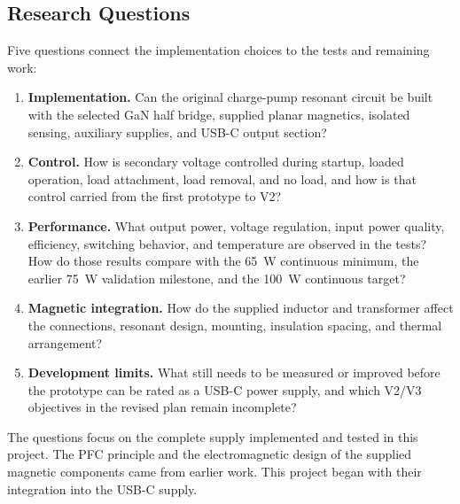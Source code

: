 \begin{samepage}
\section{Research Questions}
\label{sec:intro-rq}

Five questions connect the implementation choices to the tests and remaining work:
\begin{enumerate}[label=\textbf{RQ\arabic*:}]
\item \textbf{Implementation.} Can the original charge-pump resonant circuit be built with the selected GaN half bridge, supplied planar magnetics, isolated sensing, auxiliary supplies, and USB-C output section?
\item \textbf{Control.} How is secondary voltage controlled during startup, loaded operation, load attachment, load removal, and no load, and how is that control carried from the first prototype to V2?
\item \textbf{Performance.} What output power, voltage regulation, input power quality, efficiency, switching behavior, and temperature are observed in the tests? How do those results compare with the \SI{65}{\watt} continuous minimum, the earlier \SI{75}{\watt} validation milestone, and the \SI{100}{\watt} continuous target?
\item \textbf{Magnetic integration.} How do the supplied inductor and transformer affect the connections, resonant design, mounting, insulation spacing, and thermal arrangement?
\item \textbf{Development limits.} What still needs to be measured or improved before the prototype can be rated as a USB-C power supply, and which V2/V3 objectives in the revised plan remain incomplete?
\end{enumerate}
\end{samepage}

The questions focus on the complete supply implemented and tested in this project. The PFC principle and the electromagnetic design of the supplied magnetic components came from earlier work. This project began with their integration into the USB-C supply.
